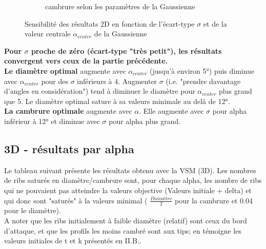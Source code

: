 \begin{figure}[h!]
\begin{subfigure}[b]{0.45\textwidth}
        \caption{cambrure selon les paramètres de la Gaussienne}
        \label{fig:cambrure gaussien 2d}
    \end{subfigure}
    \caption{Sensibilité des résultats 2D en fonction de l'écart-type $\sigma$ et de la valeur centrale $\alpha_{center}$ de la Gaussienne}
    \label{fig:gaussian sensibility 2d}
\end{figure}

\textbf{Pour $\sigma$ proche de zéro (écart-type "très petit"), les résultats convergent vers ceux de la partie précédente. }\\

\textbf{Le diamètre optimal} augmente avec $\alpha_{center}$ (jusqu'à environ 5°) puis diminue avec $\alpha_{center}$ pour des $\sigma$ inférieurs à 4. Augmenter $\sigma$ (i.e. "prendre davantage d'angles en considération") tend à diminuer le diamètre pour $\alpha_{center}$ plus grand que 5. Le diamètre optimal sature à sa valeurs minimale au delà de 12°. \\

\textbf{La cambrure optimale} augmente avec $\alpha$. Elle augmente avec $\sigma$ pour alpha inférieur à 12° et diminue avec $\sigma$ pour alpha plus grand.

\subsection{3D - résultats par alpha}

Le tableau suivant présente les résultats obtenu avec la VSM (3D). Les nombres de ribs saturés en diamètre/cambrure sont, pour chaque alpha, les nombre de ribs qui ne pouvaient pas atteindre la valeurs objective (Valeurs initiale + delta) et qui donc sont "saturés" à la valeurs minimal ( $\frac{Diamètre}{2}$ pour la cambrure et 0.04 pour le diamètre).\\

A noter que les ribs initialement à faible diamètre (relatif) sont ceux du bord d'attaque, et que les profils les moins cambré sont aux tips; en témoigne les valeurs initiales de t et k présentés en II.B..

